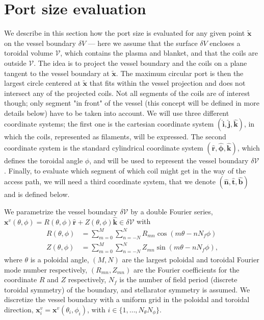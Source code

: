 \documentclass[12pt]{article}
\begin{document}
\section{Port size evaluation} \label{sec.metric}
We describe in this section how the port size is evaluated for any given point $\mathbf{\tilde x}$ on the vessel boundary $\delta V$ --- here we assume that the surface $\delta V$ encloses a toroidal volume $\mathcal{V}$, which contains the plasma and blanket, and that the coils are outside $\mathcal{V}$. The idea is to project the vessel boundary and the coils on a plane tangent to the vessel boundary at $\tilde{\mathbf{x}}$. The maximum circular port is then the largest circle centered at $\tilde{\mathbf{x}}$ that fits within the vessel projection and does not intersect any of the projected coils. Not all segments of the coils are of interest though; only segment "in front" of the vessel (this concept will be defined in more details below) have to be taken into account. We will use three different coordinate systems; the first one is the cartesian coordinate system $(\hat{\mathbf{i}},\hat{\mathbf{j}},\hat{\mathbf{k}})$, in which the coils, represented as filaments, will be expressed. The second coordinate system is the standard cylindrical coordinate system $(\hat{\mathbf{r}},\hat{\mathbf{\phi}},\hat{\mathbf{k}})$, which defines the toroidal angle $\phi$, and will be used to represent the vessel boundary $\delta\mathcal{V}$. Finally, to evaluate which segment of which coil might get in the way of the access path, we will need a third coordinate system, that we denote $(\hat{\mathbf{n}},\hat{\mathbf{t}},\hat{\textbf{b}})$ and is defined below.

We parametrize the vessel boundary $\delta \mathcal{V}$ by a double Fourier series, $\mathbf{x}^v(\theta,\phi)=R(\theta,\phi)\hat{\mathbf{r}}+Z(\theta,\phi)\hat{\mathbf{k}}\in\delta \mathcal{V}$ with 
\begin{align}
    R(\theta,\phi) &= \sum_{m=0}^{M}\sum_{n=-N}^N R_{mn}\cos(m\theta-nN_f\phi)\\
    Z(\theta,\phi) &= \sum_{m=0}^{M}\sum_{n=-N}^N Z_{mn}\sin(m\theta-nN_f\phi),
\end{align}
where $\theta$ is a poloidal angle, $(M,N)$ are the largest poloidal and toroidal Fourier mode number respectively, $(R_{mn},Z_{mn})$ are the Fourier coefficients for the coordinate $R$ and $Z$ respectively, $N_f$ is the number of field period (discrete toroidal symmetry) of the boundary, and stellarator symmetry \cite{dewar_1998} is assumed. We discretize the vessel boundary with a uniform grid in the poloidal and toroidal direction, $\mathbf{x}^v_{i} = \mathbf{x}^v(\theta_i,\phi_i)$, with $i\in\{1,\ldots, N_\theta N_\phi\}$.
\end{document}
